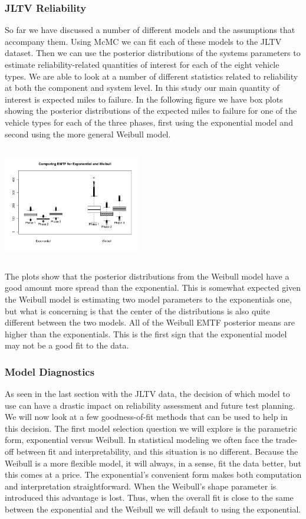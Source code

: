 \documentclass[12pt]{article}
\begin{document}
\subsubsection{JLTV Reliability}
So far we have discussed a number of different models and the assumptions that
accompany them.  Using McMC we can fit each of these models to the JLTV dataset.
Then we can use the posterior distributions of the systems parameters to
estimate reliability-related quantities of interest for each of the eight
vehicle types.  We are able to look at a number of different statistics related
to reliability at both  the component and system level.  In this study our main
quantity of interest is expected miles to  failure.  In the following figure we
have box plots showing the posterior distributions of  the expected miles to
failure for one of the vehicle types for each of the three phases, first using
the exponential model and second using the more general Weibull model.

\includegraphics[width=6cm, height=5cm]{Boxplots}

The plots show that the posterior distributions from the Weibull model have a
good amount more spread than the exponential.  This is somewhat expected given
the Weibull model is estimating two model parameters to the exponentials one,
but what is concerning is that the center of the distributions is also quite
different between the two models.  All of the Weibull EMTF posterior means
are higher than the exponentials.  This is the first sign that the exponential
model may not be a good fit to the data.

\subsubsection{Model Diagnostics}
As seen in the last section with the JLTV data, the decision of which model to
use can have a drastic impact on reliability assessment and future test
planning.  We will now look at a few  goodness-of-fit methods that can be used
to help in this decision.  The first model selection question we will explore is
the parametric form, exponential versus Weibull.  In statistical modeling we
often face the trade-off between fit and interpretability, and this situation is
no different. Because the Weibull is a more flexible model, it will always, in a
sense, fit the data better, but this comes at a price.  The exponential's
convenient form makes both computation and interpretation straightforward.  When
the Weibull's shape parameter is introduced this advantage is lost.  Thus, when
the overall fit is close to the same between the exponential and the Weibull we
will default to using the exponential.
\end{document}
